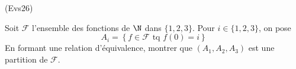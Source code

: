 \begin{tiny}(Evs26)\end{tiny} Soit $\mathcal{F}$ l'ensemble des fonctions de $\N$ dans $\{1,2,3\}$. Pour $i\in\{1,2,3\}$, on pose
\begin{displaymath}
  A_i = \left\lbrace f\in \mathcal{F} \text{ tq } f(0)=i\right\rbrace 
\end{displaymath}
En formant une relation d'équivalence, montrer que $(A_1,A_2,A_3)$ est une partition de $\mathcal{F}$.